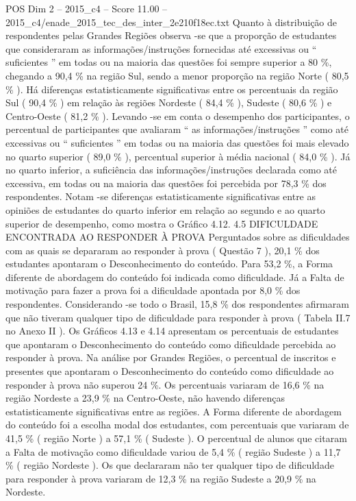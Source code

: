 \begin{textsample}{POS Dim 2 – 2015\_c4 – Score 11.00 – 2015\_c4/enade\_2015\_tec\_des\_inter\_2e210f18ec.txt}
Quanto à distribuição de respondentes pelas Grandes Regiões observa -se que a proporção de estudantes que consideraram as informações/instruções fornecidas até excessivas ou “ suficientes ” em todas ou na maioria das questões foi sempre superior a 80 \%, chegando a 90,4 \% na região Sul, sendo a menor proporção na região Norte ( 80,5 \% ).
Há diferenças estatisticamente significativas entre os percentuais da região Sul ( 90,4 \% ) em relação às regiões Nordeste ( 84,4 \% ), Sudeste ( 80,6 \% ) e Centro-Oeste ( 81,2 \% ).
Levando -se em conta o desempenho dos participantes, o percentual de participantes que avaliaram “ as informações/instruções ” como até excessivas ou “ suficientes ” em todas ou na maioria das questões foi mais elevado no quarto superior ( 89,0 \% ), percentual superior à média nacional ( 84,0 \% ).
Já no quarto inferior, a suficiência das informações/instruções declarada como até excessiva, em todas ou na maioria das questões foi percebida por 78,3 \% dos respondentes.
Notam -se diferenças estatisticamente significativas entre as opiniões de estudantes do quarto inferior em relação ao segundo e ao quarto superior de desempenho, como mostra o Gráfico 4.12. 4.5 DIFICULDADE ENCONTRADA AO RESPONDER À PROVA Perguntados sobre as dificuldades com as quais se depararam ao responder à prova ( Questão 7 ), 20,1 \% dos estudantes apontaram o Desconhecimento do conteúdo.
Para 53,2 \%, a Forma diferente de abordagem do conteúdo foi indicada como dificuldade.
Já a Falta de motivação para fazer a prova foi a dificuldade apontada por 8,0 \% dos respondentes.
Considerando -se todo o Brasil, 15,8 \% dos respondentes afirmaram que não tiveram qualquer tipo de dificuldade para responder à prova ( Tabela II.7 no Anexo II ).
Os Gráficos 4.13 e 4.14 apresentam os percentuais de estudantes que apontaram o Desconhecimento do conteúdo como dificuldade percebida ao responder à prova.
Na análise por Grandes Regiões, o percentual de inscritos e presentes que apontaram o Desconhecimento do conteúdo como dificuldade ao responder à prova não superou 24 \%.
Os percentuais variaram de 16,6 \% na região Nordeste a 23,9 \% na Centro-Oeste, não havendo diferenças estatisticamente significativas entre as regiões.
A Forma diferente de abordagem do conteúdo foi a escolha modal dos estudantes, com percentuais que variaram de 41,5 \% ( região Norte ) a 57,1 \% ( Sudeste ).
O percentual de alunos que citaram a Falta de motivação como dificuldade variou de 5,4 \% ( região Sudeste ) a 11,7 \% ( região Nordeste ).
Os que declararam não ter qualquer tipo de dificuldade para responder à prova variaram de 12,3 \% na região Sudeste a 20,9 \% na Nordeste.

\end{textsample}
